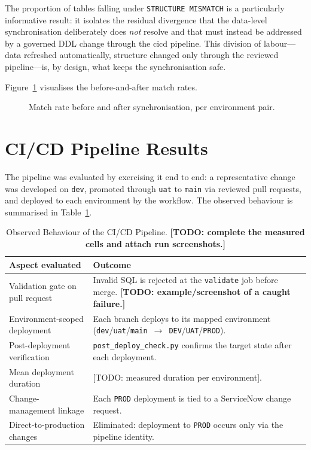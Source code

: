 The proportion of tables falling under \texttt{STRUCTURE MISMATCH} is a particularly informative result: it isolates the residual divergence that the data-level synchronisation deliberately does \emph{not} resolve and that must instead be addressed by a governed DDL change through the \gls{cicd} pipeline. This division of labour---data refreshed automatically, structure changed only through the reviewed pipeline---is, by design, what keeps the synchronisation safe.

Figure~\ref{fig:before-after-chart} visualises the before-and-after match rates.

\begin{figure}[H]
  \centering
  \caption{Match rate before and after synchronisation, per environment pair.}
  \label{fig:before-after-chart}
\end{figure}

\section{CI/CD Pipeline Results}
\label{sec:results-cicd}

The pipeline was evaluated by exercising it end to end: a representative change was developed on \texttt{dev}, promoted through \texttt{uat} to \texttt{main} via reviewed pull requests, and deployed to each environment by the workflow. The observed behaviour is summarised in Table~\ref{tab:pipeline-results}.

\begin{table}[H]
  \centering
  \begin{tabularx}{\textwidth}{X X}
    \toprule
    \rowcolor{ibmblue!15}
    \textbf{Aspect evaluated} & \textbf{Outcome} \\
    \midrule
    Validation gate on pull request & Invalid SQL is rejected at the \texttt{validate} job before merge. \textbf{[TODO: example/screenshot of a caught failure.]} \\
    Environment-scoped deployment    & Each branch deploys to its mapped environment (\texttt{dev}/\texttt{uat}/\texttt{main}~$\rightarrow$~\texttt{DEV}/\texttt{UAT}/\texttt{PROD}). \\
    Post-deployment verification     & \texttt{post\_deploy\_check.py} confirms the target state after each deployment. \\
    Mean deployment duration         & [TODO: measured duration per environment]. \\
    Change-management linkage        & Each \texttt{PROD} deployment is tied to a ServiceNow change request. \\
    Direct-to-production changes      & Eliminated: deployment to \texttt{PROD} occurs only via the pipeline identity. \\
    \bottomrule
  \end{tabularx}
  \caption{Observed Behaviour of the CI/CD Pipeline. \textbf{[TODO: complete the measured cells and attach run screenshots.]}}
  \label{tab:pipeline-results}
\end{table}

